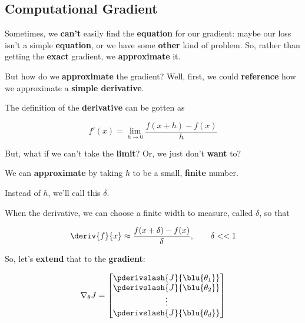     \subsection*{Computational Gradient}
    
        Sometimes, we \textbf{can't} easily find the \textbf{equation} for our gradient: maybe our loss isn't a simple \textbf{equation}, or we have some \textbf{other} kind of problem. So, rather than getting the \textbf{exact} gradient, we \textbf{approximate} it.
        
        But how do we \textbf{approximate} the gradient? Well, first, we could \textbf{reference} how we approximate a \textbf{simple derivative}.
            
        The definition of the \textbf{derivative} can be gotten as 
        
        \begin{equation}
            f'(x) = \lim_{h \rightarrow 0} \frac{f(x+h)-f(x)}{h}
        \end{equation}
        
        But, what if we can't take the \textbf{limit}? Or, we just don't \textbf{want} to? 
        
        We can \textbf{approximate} by taking $h$ to be a small, \textbf{finite} number.
        
        Instead of $h$, we'll call this $\delta$.
        
        \begin{concept}
            When  the derivative, we can choose a  finite width to measure, called $\delta$, so that
            
            \begin{equation}
                \deriv{f}{x} \approx
                \frac{f(x+\delta)-f(x)}{\delta} , \qquad \delta << 1
            \end{equation}
        \end{concept}
        
        So, let's \textbf{extend} that to the \textbf{gradient}:
        
        \begin{equation}
            \nabla_\theta J 
            = 
            \begin{bmatrix}
                  \pderivslash{J}{ \blu{\theta_1} } \\ 
                  \pderivslash{J}{ \blu{\theta_2} } \\
                  \vdots \\
                  \pderivslash{J}{ \blu{\theta_d} } \\
            \end{bmatrix}
        \end{equation}
        
